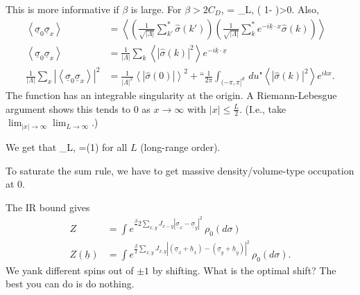 \documentclass[12pt]{book}
\theoremstyle{norm}
\begin{document}
This is more informative if $\beta$ is large. For $\beta >2 C_D$, 
\be
\left{}\right\rangle=
\left{}\right\rangle_{L,\beta} \ge \left( {1-} \right)>0.
\ee
Also, 
\begin{align}
\left\langle {\underline{\sigma}_0\underline{\sigma}_x}\right\rangle &= 
\left\langle {\left( { \frac{1}{\sqrt{|\Lambda|}} \sum_{k'}^* \widehat{\sigma}(k')} \right)
\left( {\frac{1}{\sqrt{|\Lambda|}} \sum_k^* e^{-i\underline{k} \cdot x} \widehat{\sigma}(k)} \right)}\right\rangle\\
\left\langle {\underline{\sigma}_0\underline{\sigma}_x}\right\rangle&= \frac{1}{|\Lambda|} \sum_k\left\langle { |\widehat{\sigma}(k)|^2}\right\rangle e^{-i\underline{k}\cdot \underline{x}}\\
\frac{1}{|\Lambda|}\sum_x\left| {\left\langle {\underline{\sigma}_0\underline{\sigma}_x}\right\rangle } \right|^2 &= \frac{1}{|\Lambda|^2} \left\langle {\left| {\widehat{\sigma}(0)} \right|}\right\rangle^2
+ \text{``}\frac{1}{2\pi} \int_{(-\pi, \pi]^d} \,du\text{"} \left\langle {|\widehat{\sigma}(k)|^2}\right\rangle e^{ikx}.
\end{align}
The function has an integrable singularity at the origin. A Riemann-Lebesgue argument shows this tends to 0 as $x\to \infty$ with $|x|\le \frac{L}{2}$. (I.e., take $\lim_{|x|\to \infty}\lim_{L\to \infty}$.)

We get that 
\be\left{}\right\rangle_{L,\beta} =\Omega(1)
\ee for all $L$ (long-range order).

To saturate the sum rule, we have to get massive density/volume-type occupation at 0.

The IR bound gives
\begin{align}
Z&=\int e^{\frac{\beta}{ }2 \sum_{x,y} J_{x-y} |\underline{\sigma}_x - \underline{\sigma}_y|^2 }\,\rho_0(d\sigma)\\
Z(\underline{h}) &= \int e^{\frac{\beta}{2}\sum_{x,y} J_{x,y}|(\underline{\sigma}_x + \underline{h}_x) - (\underline{\sigma}_y + \underline{h}_y)|^2}\, \rho_0(d\sigma).
\end{align}
We yank different spins out of $\pm1$ by shifting. What is the optimal shift? The best you can do is do nothing.
\end{document}
